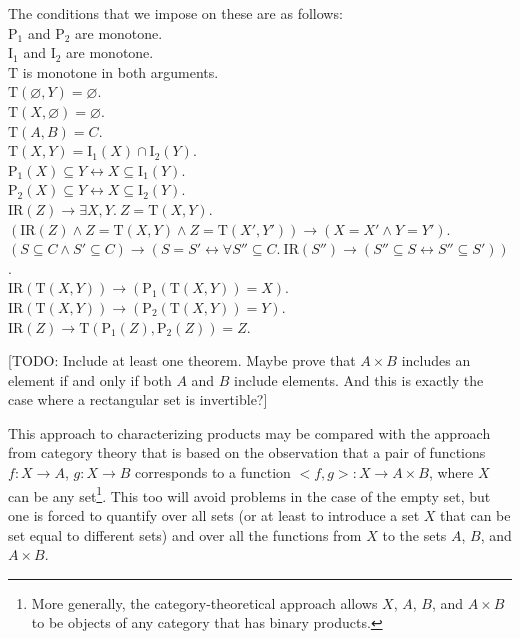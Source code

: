\documentclass[12pt]{book}
\begin{document}
The conditions that we impose on these are as follows:\\
\indent * $\mathrm{P}_1$ and $\mathrm{P}_2$ are monotone.\\
\indent * $\mathrm{I}_1$ and $\mathrm{I}_2$ are monotone.\\
\indent * $\mathrm{T}$ is monotone in both arguments.\\
\indent * $\mathrm{T}(\varnothing, Y) = \varnothing$.\\
\indent * $\mathrm{T}(X, \varnothing) = \varnothing$.\\
\indent * $\mathrm{T}(A, B) = C$.\\
\indent * $\mathrm{T}(X, Y) = \mathrm{I}_1(X) \cap \mathrm{I}_2(Y)$.\\
\indent * $\mathrm{P}_1(X) \subseteq Y \leftrightarrow X \subseteq \mathrm{I}_1(Y)$.\\
\indent * $\mathrm{P}_2(X) \subseteq Y \leftrightarrow X \subseteq \mathrm{I}_2(Y)$.\\
\indent * $\mathrm{IR}(Z) \rightarrow \exists X, Y.\ Z = \mathrm{T}(X, Y)$.\\
\indent * $(\mathrm{IR}(Z) \wedge Z = \mathrm{T}(X, Y) \wedge Z = \mathrm{T}(X', Y')) \rightarrow (X = X' \wedge Y = Y')$.\\
\indent * $(S \subseteq C \wedge S' \subseteq C) \rightarrow (S = S' \leftrightarrow \forall S'' \subseteq C.\ \mathrm{IR}(S'') \rightarrow (S'' \subseteq S \leftrightarrow S'' \subseteq S'))$.\\
\indent * $\mathrm{IR}(\mathrm{T}(X, Y)) \rightarrow (\mathrm{P}_1(\mathrm{T}(X, Y)) = X)$.\\
\indent * $\mathrm{IR}(\mathrm{T}(X, Y)) \rightarrow (\mathrm{P}_2(\mathrm{T}(X, Y)) = Y)$.\\
\indent * $\mathrm{IR}(Z) \rightarrow \mathrm{T}(\mathrm{P}_1(Z), \mathrm{P}_2(Z)) = Z$.

[TODO: Include at least one theorem. Maybe prove that $A \times B$ includes an element if and only if both $A$ and $B$ include elements. And this is exactly the case where a rectangular set is invertible?]

This approach to characterizing products may be compared with the approach from category theory that is based on the observation that a pair of functions $f: X \rightarrow A$, $g: X \rightarrow B$ corresponds to a function $<f, g> : X \rightarrow A \times B$, where $X$ can be any set\footnote{More generally, the category-theoretical approach allows $X$, $A$, $B$, and $A \times B$ to be objects of any category that has binary products.}. This too will avoid problems in the case of the empty set, but one is forced to quantify over all sets (or at least to introduce a set $X$ that can be set equal to different sets) and over all the functions from $X$ to the sets $A$, $B$, and $A \times B$.
\end{document}
